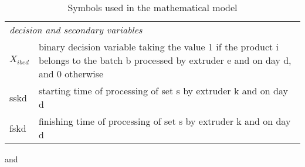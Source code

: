 \begin{table}[h!]
\begin{center}
\footnotesize
	\begin{tabular}{ l l } 

		\multicolumn{2}{l}{\emph{decision and secondary variables}} \\ 
		
		$X_{ibed}$ & binary decision variable taking the value 1 if the product i belongs to the batch b processed by extruder e and on day d, and 0 otherwise \\
sskd & starting time of processing of set s by extruder k and
on day d \\
fskd & finishing time of processing of set s by extruder k
and on day d\\

	\end{tabular}
\caption{Symbols used in the mathematical model}
\label{tab:symbols}
\end{center}
\end{table}

and \cite{RefJ}
